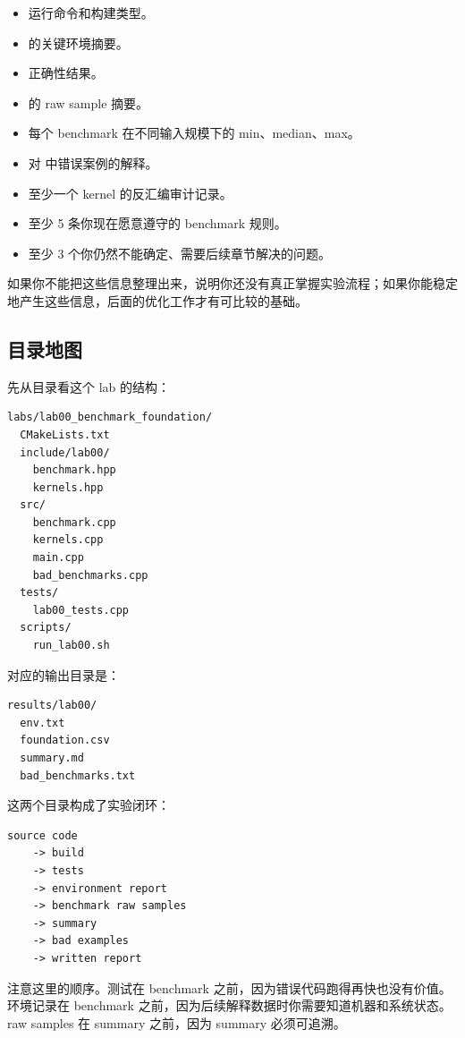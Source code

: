 \begin{itemize}
  \item 运行命令和构建类型。
  \item {} 的关键环境摘要。
  \item {} 正确性结果。
  \item {} 的 raw sample 摘要。
  \item 每个 benchmark 在不同输入规模下的 min、median、max。
  \item 对  中错误案例的解释。
  \item 至少一个 kernel 的反汇编审计记录。
  \item 至少 5 条你现在愿意遵守的 benchmark 规则。
  \item 至少 3 个你仍然不能确定、需要后续章节解决的问题。
\end{itemize}

如果你不能把这些信息整理出来，说明你还没有真正掌握实验流程；如果你能稳定地产生这些信息，后面的优化工作才有可比较的基础。

\subsection{目录地图}

先从目录看这个 lab 的结构：

\begin{lstlisting}
labs/lab00_benchmark_foundation/
  CMakeLists.txt
  include/lab00/
    benchmark.hpp
    kernels.hpp
  src/
    benchmark.cpp
    kernels.cpp
    main.cpp
    bad_benchmarks.cpp
  tests/
    lab00_tests.cpp
  scripts/
    run_lab00.sh
\end{lstlisting}

对应的输出目录是：

\begin{lstlisting}
results/lab00/
  env.txt
  foundation.csv
  summary.md
  bad_benchmarks.txt
\end{lstlisting}

这两个目录构成了实验闭环：

\begin{lstlisting}
source code
    -> build
    -> tests
    -> environment report
    -> benchmark raw samples
    -> summary
    -> bad examples
    -> written report
\end{lstlisting}

注意这里的顺序。测试在 benchmark 之前，因为错误代码跑得再快也没有价值。环境记录在 benchmark 之前，因为后续解释数据时你需要知道机器和系统状态。raw samples 在 summary 之前，因为 summary 必须可追溯。

